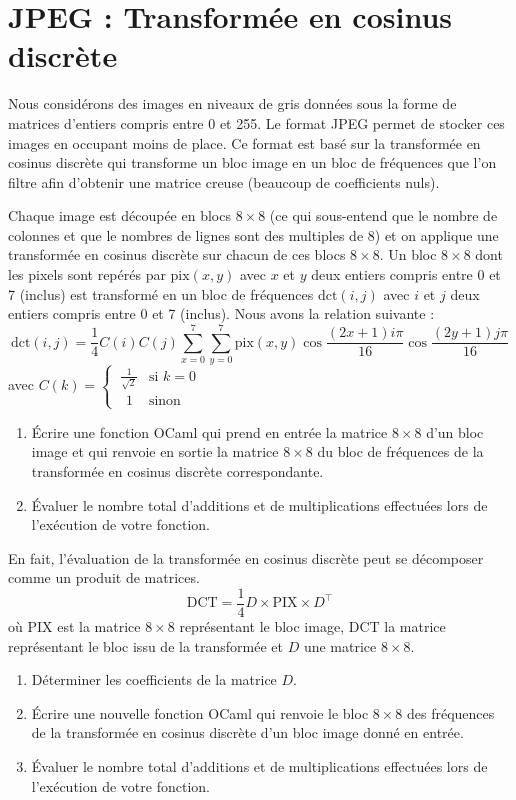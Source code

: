 \renewcommand{\SourceFile}{7-arithmetique-et-calculs-numeriques/src/7-5.ml}

\section{JPEG : Transformée en cosinus discrète}

Nous considérons des images en niveaux de gris données sous la forme de matrices d'entiers compris entre 0 et 255. Le format JPEG permet de stocker ces images en occupant moins de place. Ce format est basé sur la transformée en cosinus discrète qui transforme un bloc image en un bloc de fréquences que l'on filtre afin d'obtenir une matrice creuse (beaucoup de coefficients nuls).
\medskip

Chaque image est découpée en blocs $8 \times 8$ (ce qui sous-entend que le nombre de colonnes et que le nombres de lignes sont des multiples de 8) et on applique une transformée en cosinus discrète sur chacun de ces blocs $8 \times 8$. Un bloc $8 \times 8$ dont les pixels sont repérés par $\textrm{pix}(x,y)$ avec $x$ et $y$ deux entiers compris entre 0 et 7 (inclus) est transformé en un bloc de fréquences $\textrm{dct}(i,j)$ avec $i$ et $j$ deux entiers compris entre 0 et 7 (inclus). Nous avons la relation suivante :
\[
    \textrm{dct}(i,j) = \frac{1}{4}C(i)C(j)\sum_{x=0}^7\sum_{y=0}^7\textrm{pix}(x,y)\cos\frac{(2x+1)i\pi}{16}\cos\frac{(2y+1)j\pi}{16}
\]
avec $C(k) = \begin{cases}
      \ \frac{1}{\sqrt{2}} & \textrm{si } k=0 \\
      \ \ \, 1 & \textrm{sinon}
    \end{cases}$

\Q
\begin{enumerate}
    \item Écrire une fonction OCaml qui prend en entrée la matrice $8 \times 8$ d'un bloc image et qui renvoie en sortie la matrice $8 \times 8$ du bloc de fréquences de la transformée en cosinus discrète correspondante.
    \item Évaluer le nombre total d'additions et de multiplications effectuées lors de l'exécution de votre fonction.
\end{enumerate}

\Q
En fait, l'évaluation de la transformée en cosinus discrète peut se décomposer comme un produit de matrices.
\[
    \textrm{DCT}=\frac{1}{4}D\times\textrm{PIX}\times D^\top
\]
où PIX est la matrice $8 \times 8$ représentant le bloc image, DCT la matrice représentant le bloc issu de la transformée et $D$ une matrice $8 \times 8$.
\begin{enumerate}
    \item Déterminer les coefficients de la matrice $D$.
    \item Écrire une nouvelle fonction OCaml qui renvoie le bloc $8 \times 8$ des fréquences de la transformée en cosinus discrète d'un bloc image donné en entrée.
    \item Évaluer le nombre total d'additions et de multiplications effectuées lors de l'exécution de votre fonction.
\end{enumerate}

